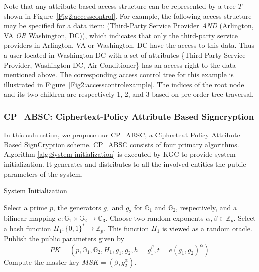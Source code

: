 \documentclass[letterpaper,12pt]{article}
\newenvironment{alginc}[1][pseudocode]{\medskip\algsetlanguage{#1}\begin{algorithmic}[1]}{\end{algorithmic}\medskip}
\begin{document}
%
Note that any attribute-based access structure can be represented by a tree $T$ shown in Figure~\ref{Fig2:accesscontrol}. For example,  the following access structure may be specified for a data item: (Third-Party Service Provider \emph{AND} (Arlington, VA \emph{OR} Washington, DC)), which indicates that only the third-party service providers in Arlington, VA or Washington, DC have the access to this data. Thus a user located in Washington DC with a set of attributes \{Third-Party Service Provider, Washington DC, Air-Conditioner\} has an access right to the data mentioned above.
The corresponding access control tree for this example is illustrated in Figure~\ref{Fig2:accesscontrolexample}. The indices of the root node and its two children are respectively 1, 2, and 3 based on pre-order tree traversal.
%
%
\subsubsection{CP\_ABSC: Ciphertext-Policy Attribute Based Signcryption}
In this subsection, we propose our CP\_ABSC, a Ciphertext-Policy Attribute-Based SignCryption scheme. CP\_ABSC consists of four primary algorithms. Algorithm \ref{alg:System initialization} is executed by KGC to provide system initialization. It generates and distributes to all the involved entities the public parameters of the system.

\begin{algorithm}[htp]
\caption{System Initialization}\label{alg:System initialization}
\begin{alginc}
\State Select a prime $p$, the generators $g_1$ and $g_2$  for $\mathbb{G}_1$ and $\mathbb{G}_2$, respectively,  and a bilinear mapping $e:  \mathbb{G}_1 \times \mathbb{G}_2 \rightarrow \mathbb{G}_3$.
\State Choose two random exponents $\alpha, \beta \in \mathbb{Z}_p$.
\State Select a hash function  $H_1: \{0,1\}^\ast \rightarrow\mathbb{Z}_p$.  This function $H_1$ is viewed as a random oracle.
\State Publish the public parameters given by
 \begin{equation}
PK=(p,\mathbb{G}_1,\mathbb{G}_2, H_1, g_1, g_2, h=g_1^\beta, t= e(g_1,g_2)^\alpha)
\end{equation}
\State Compute the master key $MSK=(\beta, g_2^\alpha)$.
\end {alginc}
\end{algorithm}
\end{document}
